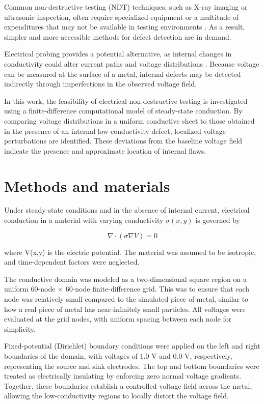 \documentclass[reprint,amsmath,amssymb,aps]{revtex4-2}
\begin{document}
Common non-destructive testing (NDT) techniques, such as X-ray imaging or ultrasonic inspection, often require specialized equipment or a multitude of expenditures that may not be available in testing environments \cite{2}. As a result, simpler and more accessible methods for defect detection are in demand.

Electrical probing provides a potential alternative, as internal changes in conductivity could alter current paths and voltage distributions \cite{3}. Because voltage can be measured at the surface of a metal, internal defects may be detected indirectly through imperfections in the observed voltage field.

In this work, the feasibility of electrical non-destructive testing is investigated using a finite-difference computational model of steady-state conduction. By comparing voltage distributions in a uniform conductive sheet to those obtained in the presence of an internal low-conductivity defect, localized voltage perturbations are identified. These deviations from the baseline voltage field indicate the presence and approximate location of internal flaws.


\section{Methods and materials}

Under steady-state conditions and in the absence of internal current, electrical conduction in a material with varying conductivity $\sigma(x,y)$ is governed by

\begin{equation}
    \nabla \cdot (\sigma \nabla V) = 0
\end{equation} \label{conductivity equation}

where V(x,y) is the electric potential. The material was assumed to be isotropic, and time-dependent factors were neglected.

The conductive domain was modeled as a two-dimensional square region on a uniform 60-node $\times$ 60-node finite-difference grid. This was to ensure that each node was relatively small compared to the simulated piece of metal, similar to how a real piece of metal has near-infinitely small particles. All voltages were evaluated at the grid nodes, with uniform spacing between each node for simplicity.

Fixed-potential (Dirichlet) boundary conditions were applied on the left and right boundaries of the domain, with voltages of 1.0 V and 0.0 V, respectively, representing the source and sink electrodes. The top and bottom boundaries were treated as electrically insulating by enforcing zero normal voltage gradients. Together, these boundaries establish a controlled voltage field across the metal, allowing the low-conductivity regions to locally distort the voltage field.
\end{document}
